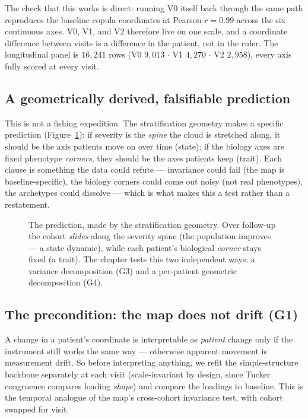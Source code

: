 The check that this works is direct: running V0 itself back through the same path reproduces the baseline copula
coordinates at Pearson $r=0.99$ across the six continuous axes. V0, V1, and V2 therefore live on one scale, and a
coordinate difference between visits is a difference in the patient, not in the ruler. The longitudinal panel is
$16{,}241$ rows (V0 $9{,}013$ $\cdot$ V1 $4{,}270$ $\cdot$ V2 $2{,}958$), every axis fully scored at every visit.

\subsection{A geometrically derived, falsifiable prediction}
This is not a fishing expedition. The stratification geometry makes a specific prediction (Figure~\ref{fig:temporalspine}):
if severity is the \emph{spine} the cloud is stretched along, it should be the axis patients move on over time
(state); if the biology axes are fixed phenotype \emph{corners}, they should be the axes patients keep (trait).
Each clause is something the data could refute --- invariance could fail (the map is baseline-specific), the
biology corners could come out noisy (not real phenotypes), the archetypes could dissolve --- which is what
makes this a test rather than a restatement.

\begin{figure}[h]\centering
\temporalspine
\caption{The prediction, made by the stratification geometry. Over follow-up the cohort \emph{slides} along the severity
spine (the population improves --- a state dynamic), while each patient's biological \emph{corner} stays fixed
(a trait). The chapter tests this two independent ways: a variance decomposition (G3) and a per-patient
geometric decomposition (G4).}
\label{fig:temporalspine}
\end{figure}

\subsection{The precondition: the map does not drift (G1)}
A change in a patient's coordinate is interpretable as \emph{patient} change only if the instrument still works
the same way --- otherwise apparent movement is measurement drift. So before interpreting anything, we refit
the simple-structure backbone separately at each visit (scale-invariant by design, since Tucker congruence
compares loading \emph{shape}) and compare the loadings to baseline. This is the temporal analogue of the map's
cross-cohort invariance test, with cohort swapped for visit.

